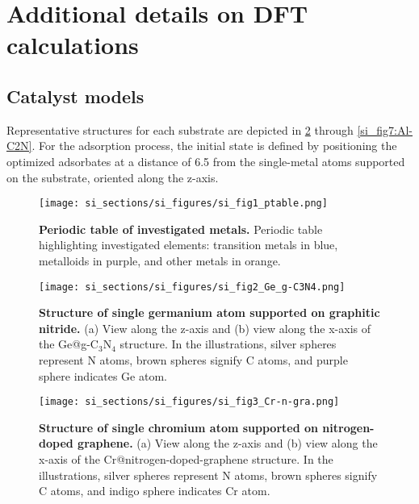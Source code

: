 

\section{Additional details on DFT calculations}


\subsection{Catalyst models}
Representative structures for each substrate are depicted in \cref{si_fig2:Ge_g-C3N4} through \cref{si_fig7:Al-C2N}. For the adsorption process, the initial state is defined by positioning the optimized adsorbates at a distance of 6.5 \text{\AA} from the single-metal atoms supported on the substrate, oriented along the z-axis.


\begin{figure}
  \centering
  \texttt{[image: si\_sections/si\_figures/si\_fig1\_ptable.png]}
  \caption{\textbf{Periodic table of investigated metals.}
  Periodic table highlighting investigated elements: transition metals in blue, metalloids in purple, and other metals in orange.}
  \label{si_fig1:shifting}
\end{figure}


\begin{figure}
  \centering
  \texttt{[image: si\_sections/si\_figures/si\_fig2\_Ge\_g-C3N4.png]}
  \caption{\textbf{Structure of single germanium atom supported on graphitic nitride.}
  (a) View along the z-axis and (b) view along the x-axis of the Ge@g-C$_3$N$_4$ structure.
  In the illustrations, silver spheres represent N atoms, brown spheres signify C atoms,
  and purple sphere indicates Ge atom.}
  \label{si_fig2:Ge_g-C3N4}
\end{figure}


\begin{figure}
  \centering
  \texttt{[image: si\_sections/si\_figures/si\_fig3\_Cr-n-gra.png]}
  \caption{\textbf{Structure of single chromium atom supported on nitrogen-doped graphene.}
  (a) View along the z-axis and (b) view along the x-axis of the Cr@nitrogen-doped-graphene structure.
  In the illustrations, silver spheres represent N atoms, brown spheres signify C atoms,
  and indigo sphere indicates Cr atom.}
  \label{si_fig3:Cr-n-gra}
\end{figure}


